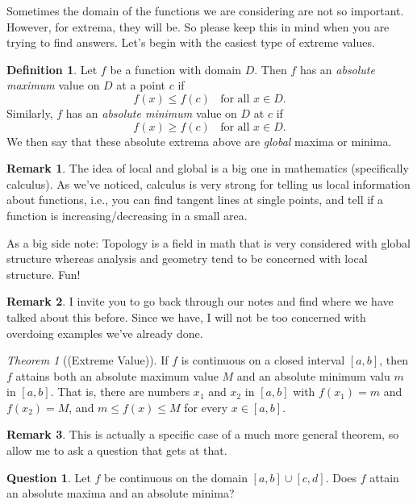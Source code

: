 \documentclass[leqno]{article}
\theoremstyle{definition}
\newtheorem{definition}{Definition}[section]
\newtheorem{remark}{Remark}[section]
\newtheorem{question}{Question}[section]
\theoremstyle{remark}
\theoremstyle{theorem}
\newtheorem{theorem}{Theorem}[section]
\begin{document}
Sometimes the domain of the functions we are considering are not so important.  However, for extrema, they will be.  So please keep this in mind when you are trying to find answers.  Let's begin with the easiest type of extreme values.

\begin{definition}
Let $f$ be a function with domain $D$. Then $f$ has an \emph{absolute maximum} value on $D$ at a point $c$ if
\[
f(x)\leq f(c) ~~~~ \textrm{for all $x \in D$}.
\]
Similarly, $f$ has an \emph{absolute minimum} value on $D$ at $c$ if
\[
f(x)\geq f(c) ~~~~ \textrm{for all $x\in D$}.
\]
We then say that these absolute extrema above are \emph{global} maxima or minima. 
\end{definition}

\begin{remark}
The idea of local and global is a big one in mathematics (specifically calculus).  As we've noticed, calculus is very strong for telling us local information about functions, i.e., you can find tangent lines at single points, and tell if a function is increasing/decreasing in a small area.  

As a big side note: Topology is a field in math that is very considered with global structure whereas analysis and geometry tend to be concerned with local structure.  Fun!
\end{remark}

\begin{remark}
I invite you to go back through our notes and find where we have talked about this before.  Since we have, I will not be too concerned with overdoing examples we've already done.
\end{remark}

\begin{theorem}[(Extreme Value)]
If $f$ is continuous on a closed interval $[a,b]$, then $f$ attains both an absolute maximum value $M$ and an absolute minimum valu $m$ in $[a,b]$. That is, there are numbers $x_1$ and $x_2$ in $[a,b]$ with $f(x_1)=m$ and $f(x_2)=M$, and $m\leq f(x) \leq M$ for every $x\in [a,b]$.
\end{theorem}

\begin{remark}
This is actually a specific case of a much more general theorem, so allow me to ask a question that gets at that.
\end{remark}

\begin{question}
Let $f$ be continuous on the domain $[a,b] \cup [c,d]$.  Does $f$ attain an absolute maxima and an absolute minima?
\vspace*{2cm}\\
\end{question}
\end{document}
